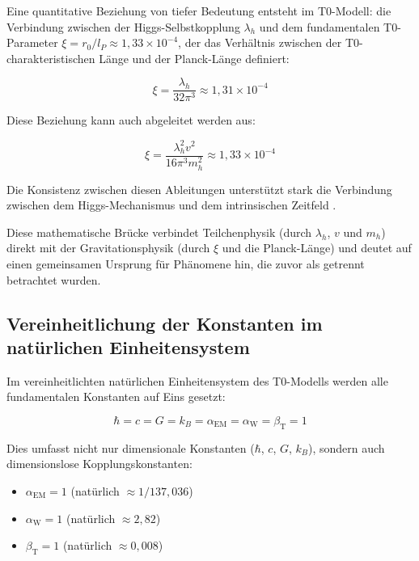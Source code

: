 \documentclass[12pt,a4paper]{article}
\newcommand{\alphaEM}{\alpha_{\text{EM}}}
\newcommand{\alphaW}{\alpha_{\text{W}}}
\newcommand{\betaT}{\beta_{\text{T}}}
\begin{document}
	Eine quantitative Beziehung von tiefer Bedeutung entsteht im T0-Modell: die Verbindung zwischen der Higgs-Selbstkopplung $\lambda_h$ und dem fundamentalen T0-Parameter $\xi = r_0/l_P \approx 1,33 \times 10^{-4}$, der das Verhältnis zwischen der T0-charakteristischen Länge und der Planck-Länge definiert:
	
	\begin{equation}
		\xi = \frac{\lambda_h}{32\pi^3} \approx 1,31 \times 10^{-4}
	\end{equation}
	
	Diese Beziehung kann auch abgeleitet werden aus:
	
	\begin{equation}
		\xi = \frac{\lambda_h^2 v^2}{16\pi^3 m_h^2} \approx 1,33 \times 10^{-4}
	\end{equation}
	
	Die Konsistenz zwischen diesen Ableitungen unterstützt stark die Verbindung zwischen dem Higgs-Mechanismus und dem intrinsischen Zeitfeld \cite{pascher_alphabeta_2025}.
	
	Diese mathematische Brücke verbindet Teilchenphysik (durch $\lambda_h$, $v$ und $m_h$) direkt mit der Gravitationsphysik (durch $\xi$ und die Planck-Länge) und deutet auf einen gemeinsamen Ursprung für Phänomene hin, die zuvor als getrennt betrachtet wurden.
	
	\subsection{Vereinheitlichung der Konstanten im natürlichen Einheitensystem}
	\label{subsec:unified_constants}
	
	Im vereinheitlichten natürlichen Einheitensystem des T0-Modells werden alle fundamentalen Konstanten auf Eins gesetzt:
	
	\begin{equation}
		\hbar = c = G = k_B = \alphaEM = \alphaW = \betaT = 1
	\end{equation}
	
	Dies umfasst nicht nur dimensionale Konstanten ($\hbar$, $c$, $G$, $k_B$), sondern auch dimensionslose Kopplungskonstanten:
	
	\begin{itemize}
		\item $\alphaEM = 1$ (natürlich $\approx 1/137,036$)
		\item $\alphaW = 1$ (natürlich $\approx 2,82$)
		\item $\betaT = 1$ (natürlich $\approx 0,008$)
	\end{itemize}
	
\end{document}
